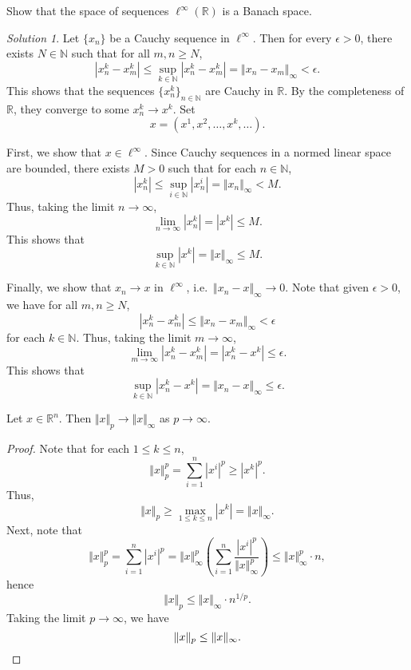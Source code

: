 \documentclass[11pt]{article}
\newcommand{\R}{\mathbb{R}}
\newcommand{\N}{\mathbb{N}}
\newcommand{\norm}[1]{\Vert #1 \Vert}
\theoremstyle{definition}
\theoremstyle{remark}
\newtheorem*{solution}{Solution}
\begin{document}
    \begin{exercise}
        Show that the space of sequences $\ell^\infty(\R)$ is a Banach space.
        \begin{solution}
            Let $\{x_n\}$ be a Cauchy sequence in $\ell^\infty$. Then for every
            $\epsilon > 0$, there exists $N \in \N$ such that for all $m, n \geq N$,
            \[
                |x_n^k - x_m^k| \leq \sup_{k \in \N} |x_n^k - x_m^k| = \norm{x_n -
                x_m}_\infty < \epsilon.
            \] This shows that the sequences $\{x_n^k\}_{n \in \N}$ are Cauchy in
            $\R$. By the completeness of $\R$, they converge to some $x_n^k \to x^k$.
            Set \[
                x = (x^1, x^2, \dots, x^k, \dots).
            \]

            First, we show that $x \in \ell^\infty$. Since Cauchy sequences in a
            normed linear space are bounded, there exists $M > 0$ such that for each
            $n \in \N$, \[
                |x_n^k| \leq \sup_{i \in \N} |x_n^i| = \norm{x_n}_\infty < M.
            \] Thus, taking the limit $n \to \infty$, \[
                \lim_{n \to \infty} |x_n^k| = |x^k| \leq M.
            \] This shows that \[
                \sup_{k \in \N} |x^k| = \norm{x}_\infty \leq M.
            \]

            Finally, we show that $x_n \to x$ in $\ell^\infty$, i.e.\ $\norm{x_n -
            x}_\infty \to 0$. Note that given $\epsilon > 0$, we have for all $m, n
            \geq N$, \[
                |x_n^k - x_m^k| \leq \norm{x_n - x_m}_\infty < \epsilon
            \] for each $k \in \N$. Thus, taking the limit $m \to \infty$, \[
                \lim_{m \to \infty} |x_n^k - x_m^k| = |x_n^k - x^k| \leq \epsilon.
            \] This shows that \[
                \sup_{k \in \N} |x_n^k - x^k| = \norm{x_n - x}_\infty \leq \epsilon.
            \]
        \end{solution}
    \end{exercise}

    \begin{lemma}
        Let $x \in \R^n$. Then $\norm{x}_p \to \norm{x}_\infty$ as $p \to \infty$.
    \end{lemma}
    \begin{proof}
        Note that for each $1 \leq k \leq n$, \[
            \norm{x}_p^p = \sum_{i = 1}^n |x^i|^p \geq |x^k|^p.
        \] Thus, \[
            \norm{x}_p \geq \max_{1 \leq k \leq n} |x^k| = \norm{x}_\infty.
        \] Next, note that \[
            \norm{x}_p^p = \sum_{i = 1}^n |x^i|^p = \norm{x}_\infty^p \left(\sum_{i =
            1}^n \frac{|x^i|^p}{\norm{x}_\infty^p}\right) \leq \norm{x}_\infty^p\cdot
            n,
        \] hence \[
            \norm{x}_p \leq \norm{x}_\infty\cdot n^{1 / p}.
        \] Taking the limit $p \to \infty$, we have \[
            \norm{x}_p \leq \norm{x}_\infty. \qedhere
        \]
    \end{proof}
\end{document}
